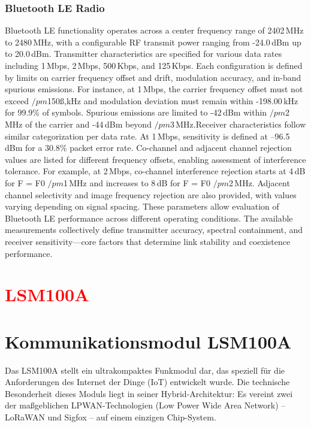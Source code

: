 \subsubsection{Bluetooth LE Radio}
Bluetooth LE functionality operates across a center frequency range of 2402\,MHz to 2480\,MHz, with a configurable RF transmit power ranging from -24.0\,dBm up to 20.0\,dBm. Transmitter characteristics are specified for various data rates including 1\,Mbps, 2\,Mbps, 500\,Kbps, and 125\,Kbps. Each configuration is defined by limits on carrier frequency offset and drift, modulation accuracy, and in-band spurious emissions. For instance, at 1\,Mbps, the carrier frequency offset must not exceed $/pm$150ß,kHz and modulation deviation must remain within -198.00\,kHz for 99.9\% of symbols. Spurious emissions are limited to -42\,dBm within $/pm$2\,MHz of the carrier and -44\,dBm beyond $/pm$3\,MHz.Receiver characteristics follow similar categorization per data rate. At 1\,Mbps, sensitivity is defined at –96.5\,dBm for a 30.8\% packet error rate. Co-channel and adjacent channel rejection values are listed for different frequency offsets, enabling assessment of interference tolerance. For example, at 2\,Mbps, co-channel interference rejection starts at 4\,dB for F = F0 $/pm$1\,MHz and increases to 8\,dB for F = F0 $/pm$2\,MHz. Adjacent channel selectivity and image frequency rejection are also provided, with values varying depending on signal spacing. These parameters allow evaluation of Bluetooth LE performance across different operating conditions. The available measurements collectively define transmitter accuracy, spectral containment, and receiver sensitivity—core factors that determine link stability and coexistence performance.

\section{\textcolor{red}{LSM100A}}%
\section{Kommunikationsmodul LSM100A} 

Das LSM100A stellt ein ultrakompaktes Funkmodul dar, das speziell für die Anforderungen des Internet der Dinge (IoT) entwickelt wurde. Die technische Besonderheit dieses Moduls liegt in seiner Hybrid-Architektur: Es vereint zwei der maßgeblichen LPWAN-Technologien (Low Power Wide Area Network) -- LoRaWAN und Sigfox -- auf einem einzigen Chip-System.

